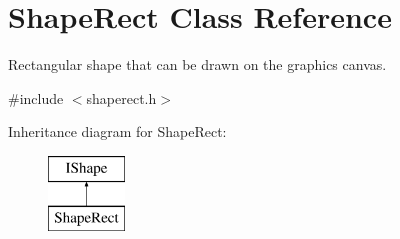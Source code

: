 \hypertarget{class_shape_rect}{}\section{Shape\+Rect Class Reference}
\label{class_shape_rect}


Rectangular shape that can be drawn on the graphics canvas.  




{\ttfamily \#include $<$shaperect.\+h$>$}

Inheritance diagram for Shape\+Rect\+:\begin{figure}[H]
\begin{center}
\leavevmode
\includegraphics[height=2.000000cm]{class_shape_rect}
\end{center}
\end{figure}
